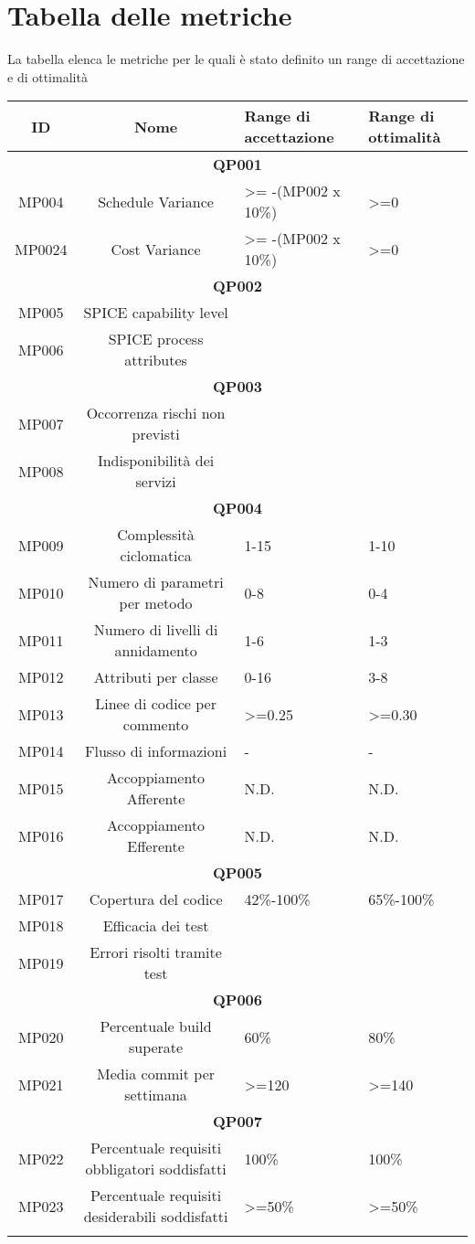 \section{Tabella delle metriche}
La tabella elenca le metriche per le quali è stato definito un range di accettazione e di ottimalità
\begin{tabularx}{\textwidth}{|c|c|X|X|}
	\hline 
	\textbf{ID} & \textbf{Nome} & \textbf{Range di accettazione}  & \textbf{Range di ottimalità}  \\ 
	\hline
	\multicolumn{4}{|c|}{\textbf{QP001}} \\
	\hline 
	MP004 & Schedule Variance & >= -(MP002 x 10\%) & >=0 \\ 
	\hline
	MP0024 &Cost Variance& >= -(MP002 x 10\%) & >=0 \\ 
	\hline
	\multicolumn{4}{|c|}{\textbf{QP002}} \\
	\hline
	MP005 & SPICE capability level &  &  \\ 
	\hline 
	MP006 & SPICE process attributes &  &  \\ 
	\hline
	\multicolumn{4}{|c|}{\textbf{QP003}} \\
	\hline
	MP007 & Occorrenza rischi non previsti &  &  \\ 
	\hline 
	MP008 & Indisponibilità dei servizi &  &  \\ 
	\hline
	\multicolumn{4}{|c|}{\textbf{QP004}} \\
	\hline
	MP009 & Complessità ciclomatica & 1-15 & 1-10 \\ 
	\hline 
	MP010 & Numero di parametri per metodo & 0-8 & 0-4 \\ 
	\hline 
	MP011 & Numero di livelli di annidamento & 1-6 & 1-3 \\ 
	\hline 
	MP012 & Attributi per classe & 0-16 & 3-8 \\ 
	\hline 
	MP013 & Linee di codice per commento & >=0.25 & >=0.30 \\ 
	\hline
	MP014 & Flusso di informazioni & - & - \\ 
	\hline 
	MP015 & Accoppiamento Afferente & N.D. & N.D. \\ 
	\hline 
	MP016 & Accoppiamento Efferente & N.D. & N.D. \\ 
	\hline
	\multicolumn{4}{|c|}{\textbf{QP005}} \\
	\hline
	MP017 & Copertura del codice & 42\%-100\% & 65\%-100\% \\ 
	\hline 
	MP018 & Efficacia dei test &  &  \\ 
	\hline 
	MP019 & Errori risolti tramite test &  &  \\ 
	\hline
	\multicolumn{4}{|c|}{\textbf{QP006}} \\
	\hline
	MP020 & Percentuale build superate& 60\% & 80\%\\
	\hline
	MP021 & Media commit per settimana & >=120 & >=140\\
	\hline
	\multicolumn{4}{|c|}{\textbf{QP007}} \\
	\hline
	MP022& Percentuale requisiti obbligatori soddisfatti& 100\% & 100\% \\
	\hline
	MP023& Percentuale requisiti desiderabili soddisfatti& >=50\% &>=50\%\\
	\hline
	\caption{Tabella delle metriche dei processi}
\end{tabularx}
